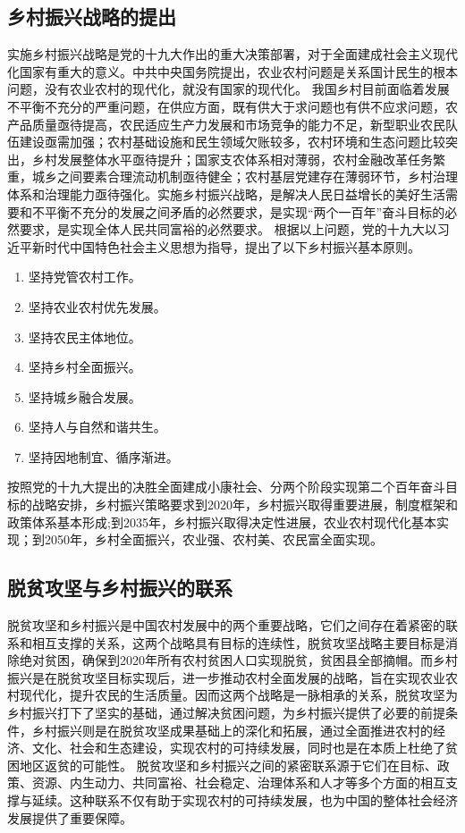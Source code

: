 \documentclass{article}
\begin{document}
\subsection{乡村振兴战略的提出}
实施乡村振兴战略是党的十九大作出的重大决策部署，对于全面建成社会主义现代化国家有重大的意义。中共中央国务院提出，农业农村问题是关系国计民生的根本问题，没有农业农村的现代化，就没有国家的现代化。
我国乡村目前面临着发展不平衡不充分的严重问题，在供应方面，既有供大于求问题也有供不应求问题，农产品质量亟待提高，农民适应生产力发展和市场竞争的能力不足，新型职业农民队伍建设亟需加强；农村基础设施和民生领域欠账较多，农村环境和生态问题比较突出，乡村发展整体水平亟待提升；国家支农体系相对薄弱，农村金融改革任务繁重，城乡之间要素合理流动机制亟待健全；农村基层党建存在薄弱环节，乡村治理体系和治理能力亟待强化。实施乡村振兴战略，是解决人民日益增长的美好生活需要和不平衡不充分的发展之间矛盾的必然要求，是实现“两个一百年”奋斗目标的必然要求，是实现全体人民共同富裕的必然要求。\cite{zgrmfy2018}
根据以上问题，党的十九大以习近平新时代中国特色社会主义思想为指导，提出了以下乡村振兴基本原则。
\begin{enumerate}
    \item 坚持党管农村工作。
    \item 坚持农业农村优先发展。
    \item 坚持农民主体地位。
    \item 坚持乡村全面振兴。
    \item 坚持城乡融合发展。
    \item 坚持人与自然和谐共生。
    \item 坚持因地制宜、循序渐进。
\end{enumerate}
按照党的十九大提出的决胜全面建成小康社会、分两个阶段实现第二个百年奋斗目标的战略安排，乡村振兴策略要求到2020年，乡村振兴取得重要进展，制度框架和政策体系基本形成;到2035年，乡村振兴取得决定性进展，农业农村现代化基本实现；到2050年，乡村全面振兴，农业强、农村美、农民富全面实现。
\subsection{脱贫攻坚与乡村振兴的联系}
脱贫攻坚和乡村振兴是中国农村发展中的两个重要战略，它们之间存在着紧密的联系和相互支撑的关系，这两个战略具有目标的连续性，脱贫攻坚战略主要目标是消除绝对贫困，确保到2020年所有农村贫困人口实现脱贫，贫困县全部摘帽。而乡村振兴是在脱贫攻坚目标实现后，进一步推动农村全面发展的战略，旨在实现农业农村现代化，提升农民的生活质量。因而这两个战略是一脉相承的关系，脱贫攻坚为乡村振兴打下了坚实的基础，通过解决贫困问题，为乡村振兴提供了必要的前提条件，乡村振兴则是在脱贫攻坚成果基础上的深化和拓展，通过全面推进农村的经济、文化、社会和生态建设，实现农村的可持续发展，同时也是在本质上杜绝了贫困地区返贫的可能性。
脱贫攻坚和乡村振兴之间的紧密联系源于它们在目标、政策、资源、内生动力、共同富裕、社会稳定、治理体系和人才等多个方面的相互支撑与延续。这种联系不仅有助于实现农村的可持续发展，也为中国的整体社会经济发展提供了重要保障。
\end{document}
